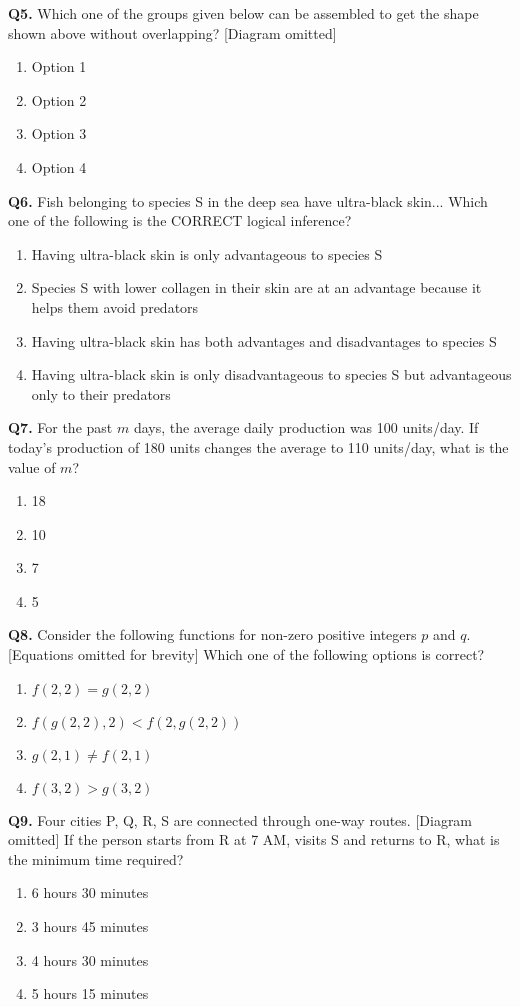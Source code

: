 \documentclass[12pt,a4paper]{article}
\begin{document}
\textbf{Q5.} Which one of the groups given below can be assembled to get the shape shown above without overlapping? [Diagram omitted]  
\begin{enumerate}
    \item Option 1
    \item Option 2
    \item Option 3
    \item Option 4
\end{enumerate}

\textbf{Q6.} Fish belonging to species S in the deep sea have ultra-black skin... Which one of the following is the CORRECT logical inference?  
\begin{enumerate}
    \item Having ultra-black skin is only advantageous to species S
    \item Species S with lower collagen in their skin are at an advantage because it helps them avoid predators
    \item Having ultra-black skin has both advantages and disadvantages to species S
    \item Having ultra-black skin is only disadvantageous to species S but advantageous only to their predators
\end{enumerate}

\textbf{Q7.} For the past $m$ days, the average daily production was 100 units/day. If today’s production of 180 units changes the average to 110 units/day, what is the value of $m$?  
\begin{enumerate}
    \item 18
    \item 10
    \item 7
    \item 5
\end{enumerate}

\textbf{Q8.} Consider the following functions for non-zero positive integers $p$ and $q$. [Equations omitted for brevity] Which one of the following options is correct?  
\begin{enumerate}
    \item $f(2,2) = g(2,2)$
    \item $f(g(2,2), 2) < f(2, g(2,2))$
    \item $g(2,1) \ne f(2,1)$
    \item $f(3,2) > g(3,2)$
\end{enumerate}

\textbf{Q9.} Four cities P, Q, R, S are connected through one-way routes. [Diagram omitted] If the person starts from R at 7 AM, visits S and returns to R, what is the minimum time required?  
\begin{enumerate}
    \item 6 hours 30 minutes
    \item 3 hours 45 minutes
    \item 4 hours 30 minutes
    \item 5 hours 15 minutes
\end{enumerate}
\end{document}
